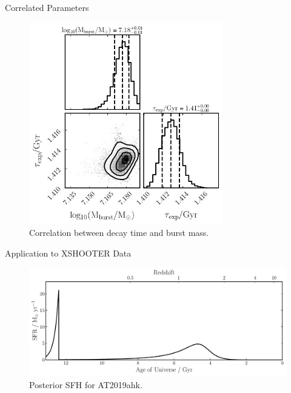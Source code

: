 \documentclass{beamer}
\begin{document}
\begin{frame}{Correlated Parameters}
  \begin{figure}
    \centering
    \includegraphics[width=0.75\textwidth]{../pipes/plots/r4_exponential_burst/phil_model_4_corner}
    \caption{Correlation between decay time and burst mass.}
  \end{figure}
\end{frame}

\begin{frame}{Application to XSHOOTER Data}
  \begin{figure}
    \centering
    \includegraphics[width=\textwidth]{../pipes/plots/r4_dblplaw_burst/AT2019ahk_sfh}
    \caption{Posterior SFH for AT2019ahk.}
  \end{figure}
\end{frame}
\end{document}
